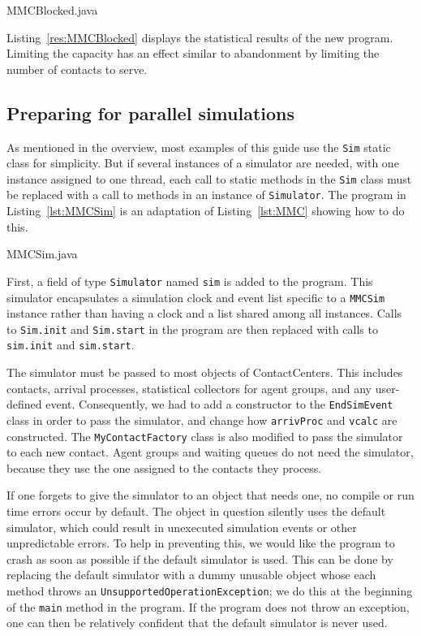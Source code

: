 
{MMCBlocked.java}

Listing~\ref{res:MMCBlocked} displays the statistical results of the
new program.  Limiting the capacity has an effect similar to
abandonment by limiting the number of contacts to serve.



\subsection{Preparing for parallel simulations}
\label{sec:MMCSim}

As mentioned in the overview, most examples of this guide use the
\texttt{Sim} static class for simplicity.
But
if several instances of a simulator are needed, with one instance
assigned to one thread, each call to
static methods in the \texttt{Sim} class must be
replaced with a call to methods in an instance of \texttt{Simulator}.
The program in Listing~\ref{lst:MMCSim} is an adaptation of
Listing~\ref{lst:MMC} showing how to do this.


{MMCSim.java}

First, a field of type \texttt{Simulator} named \texttt{sim} is added
to the program.
This simulator encapsulates a simulation clock and event list specific
to a \texttt{MMCSim} instance rather than having a clock and a list
shared among all instances.
Calls to \texttt{Sim.init} and \texttt{Sim.start}
in the program are then replaced
with calls to \texttt{sim.init} and \texttt{sim.start}.

The simulator must be passed to most objects of ContactCenters.
This includes contacts, arrival processes, statistical collectors
for agent groups, and any user-defined event.
Consequently, we had to add a constructor to the
\texttt{End\-Sim\-Event} class in order to pass the simulator, and
change how \texttt{arriv\-Proc} and \texttt{vcalc} are constructed.
The \texttt{My\-Contact\-Factory} class is also modified to pass the
simulator to each new contact.
Agent groups and waiting queues do not need the simulator, because
they use the one assigned to the contacts they process.

If one forgets to give the simulator to an object that needs one, no
compile or run time errors occur by default.
The object in question  silently uses the default simulator, which
could result in unexecuted simulation events or other unpredictable
errors.
To help in preventing this, we would like
the program to crash as soon as
possible if the default simulator is used.
This can be done by replacing the default simulator with a dummy
unusable object whose each method throws an
\texttt{Unsupported\-Operation\-Exception}; we do this at the
beginning of the \texttt{main} method in the program.
If the program does not throw an exception, one can
then be relatively
confident that the default simulator is never used.
